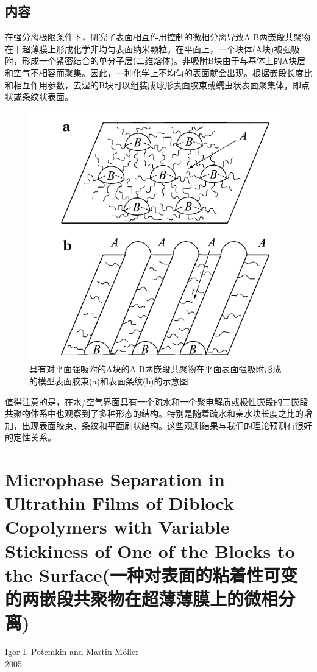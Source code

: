 \documentclass[12pt,a4paper]{article}
\numberwithin{equation}{section}
\begin{document}
\subsection{内容}
在强分离极限条件下，研究了表面相互作用控制的微相分离导致A-B两嵌段共聚物在干超薄膜上形成化学非均匀表面纳米颗粒。在平面上，一个块体(A块)被强吸附，形成一个紧密结合的单分子层(二维熔体)。非吸附B块由于与基体上的A块层和空气不相容而聚集。因此，一种化学上不均匀的表面就会出现。根据嵌段长度比和相互作用参数，去湿的B块可以组装成球形表面胶束或蠕虫状表面聚集体，即点状或条纹状表面。
\begin{figure}[H]
\centering
\includegraphics[scale=0.5]{./figures/8.png}
\caption{具有对平面强吸附的A块的A-B两嵌段共聚物在平面表面强吸附形成的模型表面胶束(a)和表面条纹(b)的示意图}
\end{figure}
值得注意的是，在水/空气界面具有一个疏水和一个聚电解质或极性嵌段的二嵌段共聚物体系中也观察到了多种形态的结构。特别是随着疏水和亲水块长度之比的增加，出现表面胶束、条纹和平面刷状结构。这些观测结果与我们的理论预测有很好的定性关系。

	
\section{Microphase Separation in Ultrathin Films of Diblock Copolymers with Variable Stickiness of One of the Blocks to the Surface(一种对表面的粘着性可变的两嵌段共聚物在超薄薄膜上的微相分离)}
\begin{center}
Igor I. Potemkin and Martin Möller \\
2005
\end{center}
\end{document}
